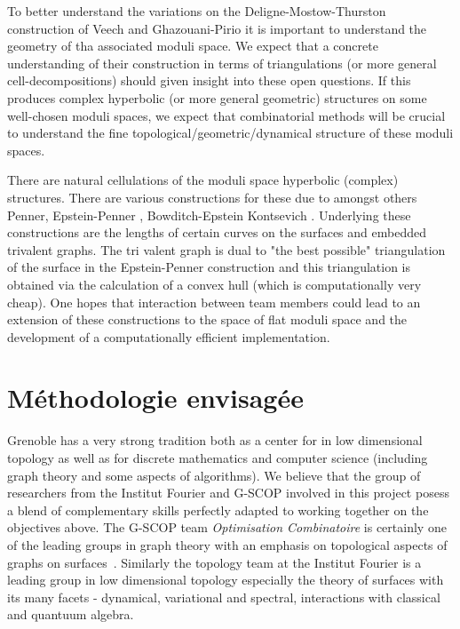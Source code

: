 \documentclass[14pt,fleqn]{article}
\begin{document}
To better understand the variations 
on the Deligne-Mostow-Thurston construction
of  Veech and Ghazouani-Pirio
it is important to understand the geometry
of tha associated moduli space.
We expect that a concrete understanding of their construction in terms of triangulations (or more general cell-decompositions) should given
insight into these open questions. 
If this produces complex hyperbolic
(or more general geometric) structures on some well-chosen moduli spaces, we expect that combinatorial methods will be crucial to understand the fine topological/geometric/dynamical structure of these
moduli spaces.

There are  natural cellulations of 
the moduli space hyperbolic (complex)  structures.
There are various constructions for these
due to amongst others Penner, 
Epstein-Penner \cite{epstein1988}, 
Bowditch-Epstein \cite{BOWDITCH198891} Kontsevich \cite{kontsevich1992}.
Underlying these constructions 
are the lengths of certain curves on the surfaces
and embedded trivalent graphs.
The tri valent graph is dual to 
"the best possible" triangulation of the surface
in the Epstein-Penner construction
and this triangulation is obtained 
via the calculation of a convex hull
(which is computationally very cheap).
One hopes that interaction between team members
could lead to an extension of these constructions
to the space of flat moduli space 
and the development of a computationally efficient implementation.
 



\section{Méthodologie envisagée}

Grenoble  has 
a very strong tradition both 
as a center for in low dimensional topology 
as well as for discrete mathematics and computer science
(including graph theory and some aspects of algorithms). 
We believe that the group of researchers from the Institut Fourier and G-SCOP 
involved
in this project posess a blend of complementary skills 
perfectly adapted
to working together on the objectives above.
The G-SCOP team \emph{Optimisation Combinatoire} is certainly one of the leading groups in graph theory with an emphasis on topological aspects of graphs on surfaces~\cite{es-wqpp-18}. 
Similarly the topology team at the Institut Fourier is a leading group in low dimensional topology 
especially the theory of surfaces 
with its many facets 
- dynamical, variational and spectral,
 interactions with classical and quantuum algebra.
 
\end{document}
